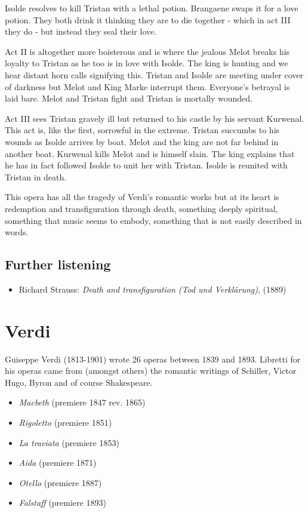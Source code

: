 Isolde resolves to kill Tristan with a lethal potion. Brangaene swaps it for a love potion. They both drink it thinking they are to die together - which in act III they do - but instead they seal their love.  

Act II is altogether more boisterous and is where the jealous Melot breaks his loyalty to Tristan as he too is in love with Isolde. The king is hunting and we hear distant horn calls signifying this. Tristan and Isolde are meeting under cover of darkness but Melot and King Marke interrupt them. Everyone's betrayal is laid bare. Melot and Tristan fight and Tristan is mortally wounded. 

Act III sees Tristan gravely ill but returned to his castle by his servant Kurwenal. This act is, like the first, sorrowful in the extreme. Tristan succumbs to his wounds as Isolde arrives by boat. Melot and the king are not far behind in another boat. Kurwenal kills Melot and is himself slain. The king explains that he has in fact followed Isolde to unit her with Tristan. Isolde is reunited with Tristan in death. 

This opera has all the tragedy of Verdi's romantic works but at its heart is redemption and transfiguration through death, something deeply spiritual, something that music seems to embody, something that is not easily described in words.   

\subsection{Further listening} 
\begin{itemize}
\item Richard Strauss: \textit{Death and transfiguration (Tod und Verkl\"arung)}, (1889)
\end{itemize}

\section{Verdi}
Guiseppe Verdi (1813-1901) wrote 26 operas between 1839 and 1893. Libretti for his operas came from (amongst others) the romantic writings of Schiller, Victor Hugo, Byron and of course Shakespeare. 

\begin{itemize}
\item \textit{Macbeth} (premiere 1847 rev. 1865)
\item \textit{Rigoletto} (premiere 1851)
\item \textit{La traviata} (premiere 1853)
\item \textit{Aida} (premiere 1871)
\item \textit{Otello} (premiere 1887)
\item \textit{Falstaff} (premiere 1893)
\end{itemize}

